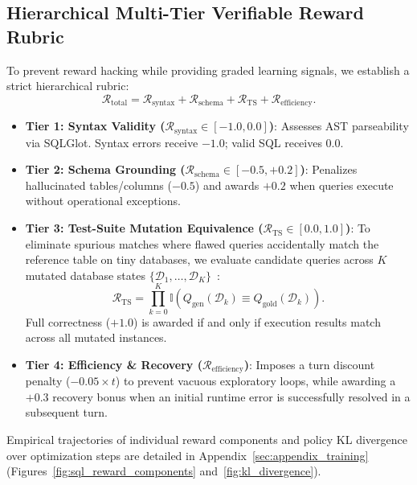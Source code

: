 \documentclass{article}
\theoremstyle{plain}
\theoremstyle{definition}
\theoremstyle{remark}
\begin{document}
\subsection{Hierarchical Multi-Tier Verifiable Reward Rubric}
To prevent reward hacking while providing graded learning signals, we establish a strict hierarchical rubric:
\begin{equation}
    \mathcal{R}_{\text{total}} = \mathcal{R}_{\text{syntax}} + \mathcal{R}_{\text{schema}} + \mathcal{R}_{\text{TS}} + \mathcal{R}_{\text{efficiency}}.
\end{equation}

\begin{itemize}[leftmargin=*,itemsep=1pt]
    \item \textbf{Tier 1: Syntax Validity ($\mathcal{R}_{\text{syntax}} \in [-1.0, 0.0]$)}: Assesses AST parseability via SQLGlot. Syntax errors receive $-1.0$; valid SQL receives $0.0$.
    \item \textbf{Tier 2: Schema Grounding ($\mathcal{R}_{\text{schema}} \in [-0.5, +0.2]$)}: Penalizes hallucinated tables/columns ($-0.5$) and awards $+0.2$ when queries execute without operational exceptions.
    \item \textbf{Tier 3: Test-Suite Mutation Equivalence ($\mathcal{R}_{\text{TS}} \in [0.0, 1.0]$)}: To eliminate spurious matches where flawed queries accidentally match the reference table on tiny databases, we evaluate candidate queries across $K$ mutated database states $\{\mathcal{D}_1, \dots, \mathcal{D}_K\}$~\citep{zhong2020semantic}:
    \begin{equation}
        \mathcal{R}_{\text{TS}} = \prod_{k=0}^K \mathbb{I} \left( Q_{\text{gen}}(\mathcal{D}_k) \equiv Q_{\text{gold}}(\mathcal{D}_k) \right).
    \end{equation}
    Full correctness ($+1.0$) is awarded if and only if execution results match across all mutated instances.
    \item \textbf{Tier 4: Efficiency \& Recovery ($\mathcal{R}_{\text{efficiency}}$)}: Imposes a turn discount penalty ($-0.05 \times t$) to prevent vacuous exploratory loops, while awarding a $+0.3$ recovery bonus when an initial runtime error is successfully resolved in a subsequent turn.
\end{itemize}

Empirical trajectories of individual reward components and policy KL divergence over optimization steps are detailed in Appendix~\ref{sec:appendix_training} (Figures~\ref{fig:sql_reward_components} and~\ref{fig:kl_divergence}).
\end{document}
